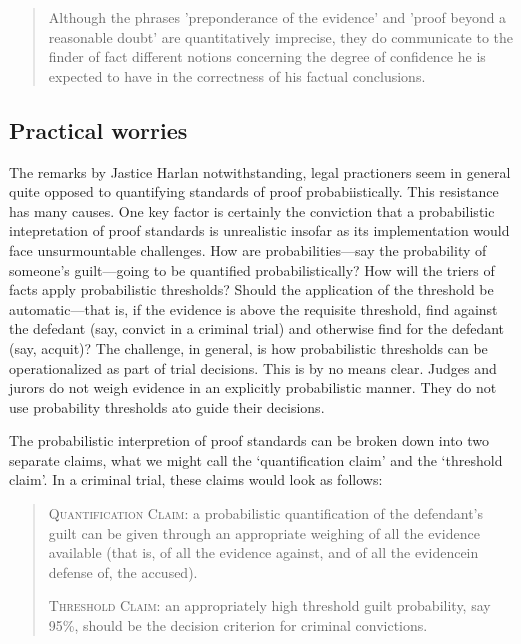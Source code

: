 \documentclass[10pt,dvipsnames,enabledeprecatedfontcommands]{scrartcl}
\begin{document}
\begin{quote}
Although the phrases 'preponderance of the evidence' and 'proof beyond a reasonable doubt' are quantitatively imprecise, they do communicate to the finder of fact different notions concerning the degree of confidence he is expected to have in the correctness of his factual conclusions.
\end{quote}

\subsection{Practical worries}\label{practical-worries}

The remarks by Jastice Harlan notwithstanding, legal practioners seem in
general quite opposed to quantifying standards of proof
probabiistically. This resistance has many causes. One key factor is
certainly the conviction that a probabilistic intepretation of proof
standards is unrealistic insofar as its implementation would face
unsurmountable challenges. How are probabilities---say the probability
of someone's guilt---going to be quantified probabilistically? How will
the triers of facts apply probabilistic thresholds? Should the
application of the threshold be automatic---that is, if the evidence is
above the requisite threshold, find against the defedant (say, convict
in a criminal trial) and otherwise find for the defedant (say, acquit)?
The challenge, in general, is how probabilistic thresholds can be
operationalized as part of trial decisions. This is by no means clear.
Judges and jurors do not weigh evidence in an explicitly probabilistic
manner. They do not use probability thresholds ato guide their
decisions.

The probabilistic interpretion of proof standards can be broken down
into two separate claims, what we might call the `quantification claim'
and the `threshold claim'. In a criminal trial, these claims would look
as follows:

\begin{quote}
 \textsc{Quantification Claim}: a probabilistic quantification of the defendant's guilt can 
 be given through an appropriate weighing of all the evidence available (that is, of all the evidence against, and of all the evidencein defense of, the accused).
 
 \textsc{Threshold Claim}: an appropriately high threshold guilt probability, say 95\%, 
 should be the decision criterion for criminal convictions.
  \end{quote}
\end{document}
